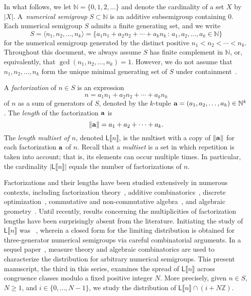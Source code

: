 \documentclass[10pt,reqno]{amsart}
\newcommand{\NN}{\mathbb{N}}
\newcommand{\ZZ}{\mathbb{Z}}
\newcommand{\Le}{\mathsf{L}}
\renewcommand{\vec}[1]{{\bf #1}}
\providecommand{\multi}[1]{\llbracket #1 \rrbracket}
\newcommand{\0}{\color{lightgray}0}
\renewcommand\>{\rangle}
\newcommand\<{\langle}
\theoremstyle{plain}
\theoremstyle{definition}
\begin{document}
In what follows, we let $\NN = \{0,1,2,\ldots\}$ and denote the cardinality of a set $X$ by $|X|$.
A~\emph{numerical semigroup} $S \subset \NN$ is an additive subsemigroup containing $0$.  Each numerical semigroup $S$ admits a finite generating set, and we write 
\begin{equation*}
S = \<n_1, n_2, \ldots, n_k\> = \{a_1n_1 + a_2 n_2 + \cdots + a_kn_k \,:\, a_1,a_2, \ldots, a_k \in \NN\}
\end{equation*}
for the numerical semigroup generated by the distinct positive $n_1 < n_2 < \cdots < n_k$.
Throughout this document, we always assume $S$ has finite complement in $\NN$, or, equivalently, that $\gcd(n_1,n_2, \ldots, n_k) = 1$.  However, we do not assume that $n_1, n_2, \ldots, n_k$ form the unique minimal generating set of $S$ under containment~\cite{NSBook}.  

A \emph{factorization} of $n \in S$ is an expression
\begin{equation*}
n = a_1n_1 + a_2 n_2 + \cdots + a_kn_k
\end{equation*}
of $n$ as a sum of generators of $S$, denoted by the $k$-tuple 
$\vec{a} = (a_1, a_2, \ldots, a_k) \in \NN^k$.  
The \emph{length} of the factorization $\vec{a}$ is 
\begin{equation*}
\|\vec{a}\| = a_1 + a_2 + \cdots + a_k.
\end{equation*}
The \emph{length multiset of $n$}, denoted $\Le\multi{n}$, is the multiset 
with a copy of $\|\vec{a}\|$ for each factorization $\vec{a}$ of $n$.  Recall that a \emph{multiset} 
is a set in which repetition is taken into account; that is, its elements can occur multiple times.  In particular, the cardinality 
$|\Le \multi{n}|$ equals the number of factorizations of $n$.  

Factorizations and their lengths have been studied extensively in numerous contexts, including factorization theory~\cite{nonuniq,GH92,structurethm}, additive combinatorics~\cite{krulldeltaset,numericalfactorsurvey}, discrete optimization~\cite{pisinger1998knapsack,de2013algebraic}, commutative and non-commutative algebra~\cite{modulessurvey,noncommutativefactor}, and algebraic geometry~\cite{abhyankar1967local,barucci1997maximality}.  
Until recently, results concerning the multiplicities of factorization lengths have been surprisingly absent from the literature.  Initiating the study of $\Le\multi{n}$ was ~\cite{lengthdistribution1}, wherein a closed form for the limiting distribution is obtained for three-generator numerical semigroups via careful combinatorial arguments.  In a sequel paper~\cite{GOOY}, measure theory and algebraic combinatorics are used to characterize the distribution for arbitrary numerical semigroups.  
This present manuscript, the third in this series, examines the spread of $\Le\multi{n}$ across congruence classes modulo a fixed positive integer $N$.  More precisely, given $n \in S$, $N \ge 1$, and $i \in \{0, \ldots, N-1\}$, we study the distribution of $\Le\multi{n} \cap (i + N\ZZ)$.  
\end{document}
